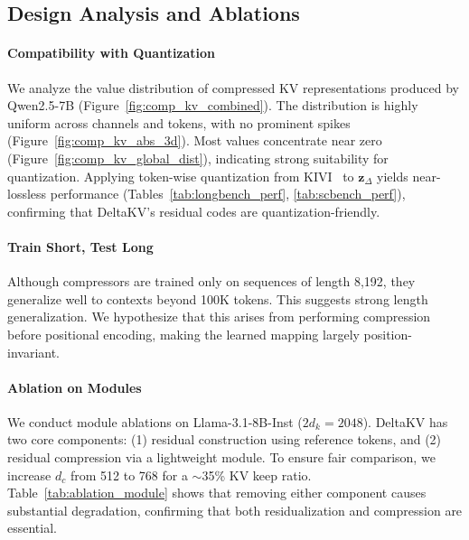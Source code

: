 \subsection{Design Analysis and Ablations}
\label{sec:expt:analysis}

\paragraph{Compatibility with Quantization}
We analyze the value distribution of compressed KV representations produced by Qwen2.5-7B (Figure~\ref{fig:comp_kv_combined}).
The distribution is highly uniform across channels and tokens, with no prominent spikes (Figure~\ref{fig:comp_kv_abs_3d}). Most values concentrate near zero (Figure~\ref{fig:comp_kv_global_dist}), indicating strong suitability for quantization.
Applying token-wise quantization from KIVI~\cite{liu2024kivi} to $\bm{z}_\Delta$ yields near-lossless performance (Tables~\ref{tab:longbench_perf}, \ref{tab:scbench_perf}), confirming that DeltaKV's residual codes are quantization-friendly.


\paragraph{Train Short, Test Long} 
Although compressors are trained only on sequences of length 8,192, they generalize well to contexts beyond 100K tokens. 
This suggests strong length generalization. We hypothesize that this arises from performing compression before positional encoding, making the learned mapping largely position-invariant.


\paragraph{Ablation on Modules}
We conduct module ablations on Llama-3.1-8B-Inst ($2d_k=2048$). 
DeltaKV has two core components:
(1) residual construction using reference tokens, and
(2) residual compression via a lightweight module.
To ensure fair comparison, we increase $d_c$ from 512 to 768 for a $\sim$35\% KV keep ratio. Table~\ref{tab:ablation_module} shows that removing either component causes substantial degradation, confirming that both residualization and compression are essential.




